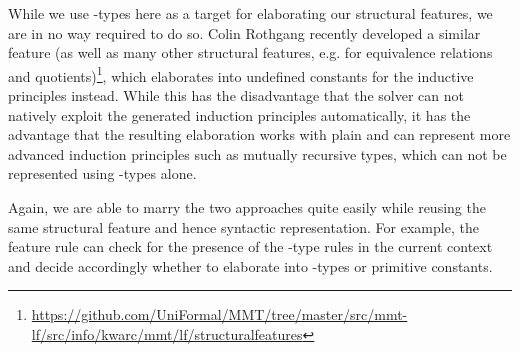 \begin{remark}\label{rem:lf:lfx:induct}
	While we use \wtypesym-types here as a target for elaborating our structural features, we are in no way required to do so. Colin Rothgang recently developed a similar feature (as well as many other structural features, e.g. for equivalence relations and quotients)\footnote{\url{https://github.com/UniFormal/MMT/tree/master/src/mmt-lf/src/info/kwarc/mmt/lf/structuralfeatures}}, which elaborates into undefined constants for the inductive principles instead. While this has the disadvantage that the solver can not natively exploit the generated induction principles automatically, it has the advantage that the resulting elaboration works with plain \LF and can represent more advanced induction principles such as mutually recursive types, which can not be represented using \wtypesym-types alone.
	
	Again, we are able to marry the two approaches quite easily while reusing the same structural feature and hence syntactic representation. For example, the feature rule can check for the presence of the \wtypesym-type rules in the current context and decide accordingly whether to elaborate into \wtypesym-types or primitive \LF constants.
\end{remark}
